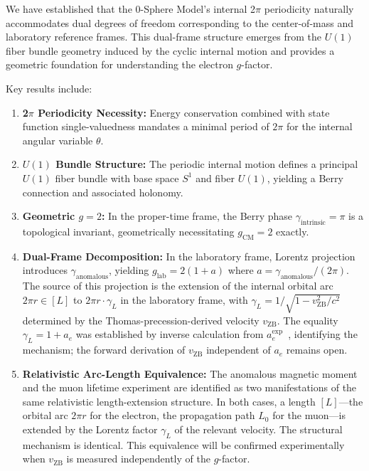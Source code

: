 \documentclass[%
 reprint,
 amsmath,amssymb,
 aps,
 prb,
]{revtex4-2}
\numberwithin{equation}{section}
\theoremstyle{definition}
\theoremstyle{remark}
\newcommand{\Sone}{S^1}
\newcommand{\Uone}{U(1)}
\begin{document}
We have established that the 0-Sphere Model's internal 2$\pi$ periodicity naturally accommodates dual degrees of freedom corresponding to the center-of-mass and laboratory reference frames. This dual-frame structure emerges from the $\Uone$ fiber bundle geometry induced by the cyclic internal motion and provides a geometric foundation for understanding the electron $g$-factor.

Key results include:

\begin{enumerate}
\item \textbf{2$\pi$ Periodicity Necessity:} Energy conservation combined with state function single-valuedness mandates a minimal period of $2\pi$ for the internal angular variable $\theta$.

\item \textbf{$\Uone$ Bundle Structure:} The periodic internal motion defines a principal $\Uone$ fiber bundle with base space $\Sone$ and fiber $\Uone$, yielding a Berry connection and associated holonomy.

\item \textbf{Geometric $g=2$:} In the proper-time frame, the Berry phase $\gamma_{\text{intrinsic}} = \pi$ is a topological invariant, geometrically necessitating $g_{\text{CM}} = 2$ exactly.

\item \textbf{Dual-Frame Decomposition:} In the laboratory frame, Lorentz projection introduces $\gamma_{\text{anomalous}}$, yielding $g_{\text{lab}} = 2(1 + a)$ where $a = \gamma_{\text{anomalous}}/(2\pi)$. The source of this projection is the extension of the internal orbital arc $2\pi r \in [L]$ to $2\pi r \cdot \gamma_L$ in the laboratory frame, with $\gamma_L = 1/\sqrt{1 - v_{\text{ZB}}^2/c^2}$ determined by the Thomas-precession-derived velocity $v_{\text{ZB}}$. The equality $\gamma_L = 1 + a_e$ was established by inverse calculation from $a_e^{\text{exp}}$~\cite{Hanamura_2026_35}, identifying the mechanism; the forward derivation of $v_{\text{ZB}}$ independent of $a_e$ remains open.

\item \textbf{Relativistic Arc-Length Equivalence:} The anomalous magnetic moment and the muon lifetime experiment are identified as two manifestations of the same relativistic length-extension structure. In both cases, a length $[L]$---the orbital arc $2\pi r$ for the electron, the propagation path $L_0$ for the muon---is extended by the Lorentz factor $\gamma_L$ of the relevant velocity. The structural mechanism is identical. This equivalence will be confirmed experimentally when $v_{\text{ZB}}$ is measured independently of the $g$-factor.


\end{enumerate}
\end{document}
